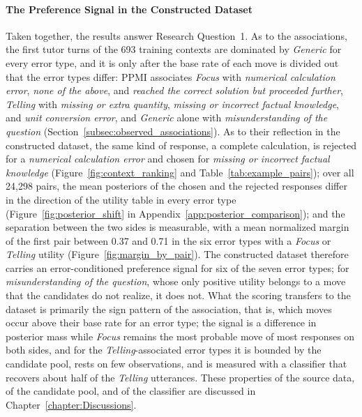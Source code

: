 \paragraph{The Preference Signal in the Constructed Dataset}
Taken together, the results answer Research Question~1. As to the associations, the first tutor turns of the 693 training contexts are dominated by \textit{Generic} for every error type, and it is only after the base rate of each move is divided out that the error types differ: PPMI associates \textit{Focus} with \textit{numerical calculation error}, \textit{none of the above}, and \textit{reached the correct solution but proceeded further}, \textit{Telling} with \textit{missing or extra quantity}, \textit{missing or incorrect factual knowledge}, and \textit{unit conversion error}, and \textit{Generic} alone with \textit{misunderstanding of the question} (Section~\ref{subsec:observed_associations}). As to their reflection in the constructed dataset, the same kind of response, a complete calculation, is rejected for a \textit{numerical calculation error} and chosen for \textit{missing or incorrect factual knowledge} (Figure~\ref{fig:context_ranking} and Table~\ref{tab:example_pairs}); over all 24,298 pairs, the mean posteriors of the chosen and the rejected responses differ in the direction of the utility table in every error type (Figure~\ref{fig:posterior_shift} in Appendix~\ref{app:posterior_comparison}); and the separation between the two sides is measurable, with a mean normalized margin of the first pair between 0.37 and 0.71 in the six error types with a \textit{Focus} or \textit{Telling} utility (Figure~\ref{fig:margin_by_pair}). The constructed dataset therefore carries an error-conditioned preference signal for six of the seven error types; for \textit{misunderstanding of the question}, whose only positive utility belongs to a move that the candidates do not realize, it does not. What the scoring transfers to the dataset is primarily the sign pattern of the association, that is, which moves occur above their base rate for an error type; the signal is a difference in posterior mass while \textit{Focus} remains the most probable move of most responses on both sides, and for the \textit{Telling}-associated error types it is bounded by the candidate pool, rests on few observations, and is measured with a classifier that recovers about half of the \textit{Telling} utterances. These properties of the source data, of the candidate pool, and of the classifier are discussed in Chapter~\ref{chapter:Discussions}.


